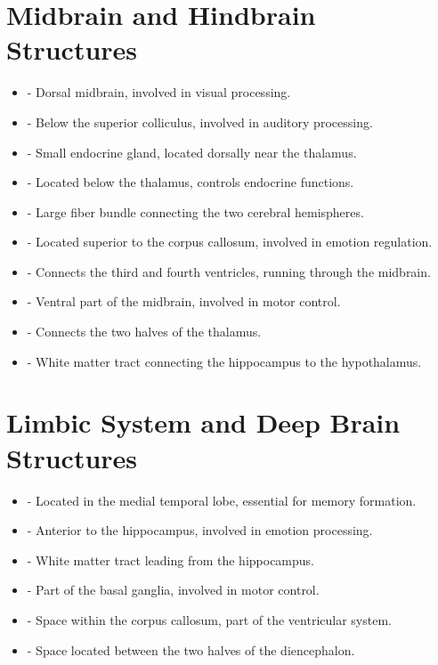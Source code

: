 \section*{Midbrain and Hindbrain Structures}
\begin{itemize}
    \item {} - Dorsal midbrain, involved in visual processing.
    \item {} - Below the superior colliculus, involved in auditory processing.
    \item {} - Small endocrine gland, located dorsally near the thalamus.
    \item {} - Located below the thalamus, controls endocrine functions.
    \item {} - Large fiber bundle connecting the two cerebral hemispheres.
    \item {} - Located superior to the corpus callosum, involved in emotion regulation.
    \item {} - Connects the third and fourth ventricles, running through the midbrain.
    \item {} - Ventral part of the midbrain, involved in motor control.
    \item {} - Connects the two halves of the thalamus.
    \item {} - White matter tract connecting the hippocampus to the hypothalamus.
\end{itemize}

\section*{Limbic System and Deep Brain Structures}
\begin{itemize}
    \item {} - Located in the medial temporal lobe, essential for memory formation.
    \item {} - Anterior to the hippocampus, involved in emotion processing.
    \item {} - White matter tract leading from the hippocampus.
    \item {} - Part of the basal ganglia, involved in motor control.
    \item {} - Space within the corpus callosum, part of the ventricular system.
    \item {} - Space located between the two halves of the diencephalon.
\end{itemize}